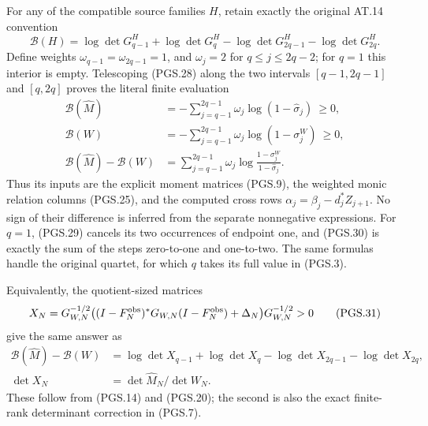 For any of the compatible source families \(H\), retain exactly
the original AT.14 convention
\[
 \mathcal B(H)=\log\det G^H_{q-1}+\log\det G^H_q
                 -\log\det G^H_{2q-1}-\log\det G^H_{2q}.
\tag{PGS.29}\label{eq:pgs-four-signs}
\]
Define weights \(\omega_{q-1}=\omega_{2q-1}=1\), and
\(\omega_j=2\) for \(q\le j\le2q-2\); for \(q=1\)
this interior is empty. Telescoping (PGS.28) along the two
intervals \([q-1,2q-1]\) and \([q,2q]\) proves the literal
finite evaluation
\[
\begin{aligned}
 \mathcal B(\widehat M)
       &=-\sum_{j=q-1}^{2q-1}\omega_j
                          \log(1-\widehat\sigma_j)\ \ge0,\\
 \mathcal B(W)
       &=-\sum_{j=q-1}^{2q-1}\omega_j
                          \log(1-\sigma_j^W)\ \ge0,\\
 \mathcal B(\widehat M)-\mathcal B(W)
       &=\sum_{j=q-1}^{2q-1}\omega_j
                  \log\frac{1-\sigma_j^W}{1-\widehat\sigma_j}.
\end{aligned}
\tag{PGS.30}\label{eq:pgs-four-rank-one}
\]
Thus its inputs are the explicit moment matrices (PGS.9), the
weighted monic relation columns (PGS.25), and the computed cross
rows \(\alpha_j=\beta_j-d_j^*Z_{j+1}\). No sign of their
difference is inferred from the separate nonnegative expressions.
For \(q=1\), (PGS.29) cancels its two occurrences of endpoint
one, and (PGS.30) is exactly the sum of the steps zero-to-one and
one-to-two. The same formulas handle the original quartet, for
which \(q\) takes its full value in (PGS.3).

Equivalently, the quotient-sized matrices
\[
 X_N=G_{W,N}^{-1/2}
       \bigl((I-F_N^{\rm obs})^*G_{W,N}(I-F_N^{\rm obs})
                           +\Delta_N\bigr)G_{W,N}^{-1/2}>0
\tag{PGS.31}\label{eq:pgs-quotient-ratio}
\]
give the same answer as
\[
\begin{aligned}
 \mathcal B(\widehat M)-\mathcal B(W)
   &=\log\det X_{q-1}+\log\det X_q
        -\log\det X_{2q-1}-\log\det X_{2q},\\
 \det X_N&=\det\widehat M_N/\det W_N.
\end{aligned}
\tag{PGS.32}\label{eq:pgs-four-ratio}
\]
These follow from (PGS.14) and (PGS.20); the second is also
the exact finite-rank determinant correction in (PGS.7).

